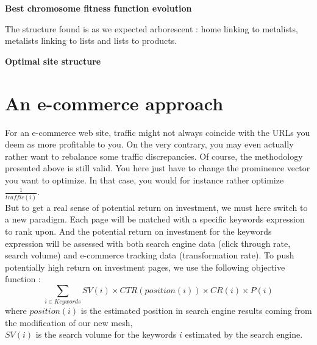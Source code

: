 \documentclass{iSWAGArticle}
\begin{document}
  \begin{center}
  \textbf{\large Best chromosome fitness function evolution}
  \end{center}
  \begin{center}
  \end{center}
  The structure found is as we expected arborescent : home linking to metalists, metalists linking to lists and lists to products.
  \begin{center}
  \textbf{\large Optimal site structure}
  \end{center}
  \begin{center}
  \end{center}
  \section{An e-commerce approach}
  For an e-commerce web site, traffic might not always coincide with the URLs you deem as more profitable to you.
  On the very contrary, you may even actually rather want to rebalance some traffic discrepancies.
  Of course, the methodology presented above is still valid. You here just have to change the prominence vector you want to
  optimize. In that case, you would for instance rather optimize $\frac{1}{traffic\left(i\right)}$.
  \\\newline
  But to get a real sense of potential return on investment, we must here switch to a new paradigm.
  Each page will be matched with a specific keywords expression to rank upon. And the potential return on investment for the keywords expression will
  be assessed with both search engine data (click through rate, search volume) and e-commerce tracking data (transformation rate).
  To push potentially high return on investment pages, we use the following objective function :
  \begin{equation}
  \sum_{i\in Keywords} SV\left( i\right)\times CTR\left(position\left(i\right)\right)\times CR\left(i\right)\times P\left(i\right)
  \end{equation}
  where $position\left(i\right)$ is the estimated position in search engine results coming from the modification of our new mesh,
  \\\newline
  $SV\left(i\right)$ is the search volume for the keywords $i$ estimated by the search engine.
  \\\newline
\end{document}

